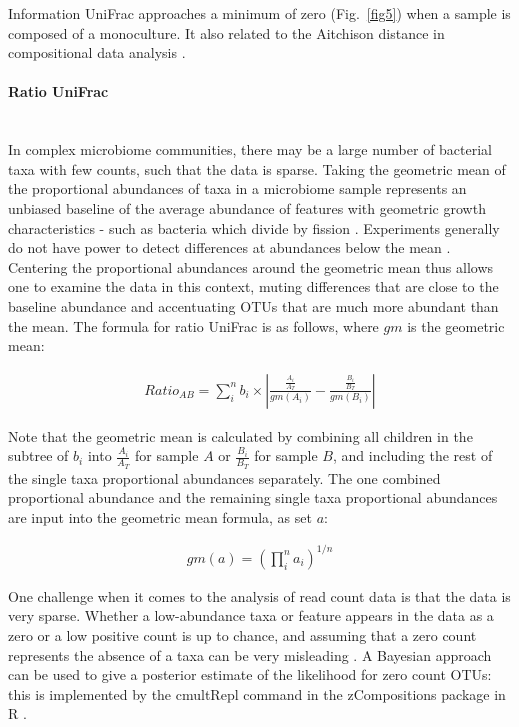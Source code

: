\documentclass[10pt,letterpaper]{article}
\begin{document}
Information UniFrac approaches a minimum of zero (Fig.~\ref{fig5}) when a sample is composed of a monoculture. It also related to the Aitchison distance in compositional data analysis \cite{egozcue2011evidence}.

\paragraph{Ratio UniFrac}\mbox{}\\
In complex microbiome communities, there may be a large number of bacterial taxa with few counts, such that the data is sparse. Taking the geometric mean of the proportional abundances of taxa in a microbiome sample represents an unbiased baseline of the average abundance of features with geometric growth characteristics - such as bacteria which divide by fission \cite{aitchison1982statistical}. Experiments generally do not have power to detect differences at abundances below the mean \cite{fernandes2013anova}. Centering the proportional abundances around the geometric mean thus allows one to examine the data in this context, muting differences that are close to the baseline abundance and accentuating OTUs that are much more abundant than the mean. The formula for ratio UniFrac is as follows, where $gm$ is the geometric mean:

\begin{align*}
Ratio_{AB} = \sum_{i}^{n} b_{i} \times \left| \frac{\frac{A_{i}}{A_{T}}}{gm(A_{i})} - \frac{\frac{B_{i}}{B_{T}}}{{gm(B_{i})}} \right|
\end{align*}

Note that the geometric mean is calculated by combining all children in the subtree of $b_{i}$ into $\frac{A_{i}}{A_{T}}$ for sample $A$ or $\frac{B_{i}}{B_{T}}$ for sample $B$, and including the rest of the single taxa proportional abundances separately. The one combined proportional abundance and the remaining single taxa proportional abundances are input into the geometric mean formula, as set $a$:

\begin{align*}
gm(a) = \left( \prod_{i}^{n} a_{i}\right)^{1/n}
\end{align*}

One challenge when it comes to the analysis of read count data is that the data is very sparse. Whether a low-abundance taxa or feature appears in the data as a zero or a low positive count is up to chance, and assuming that a zero count represents the absence of a taxa can be very misleading \cite{fernandes2013anova}. A Bayesian approach can be used to give a posterior estimate of the likelihood for zero count OTUs: this is implemented by the cmultRepl command in the zCompositions package in R \cite{palarea2015zcompositions}.
\end{document}

